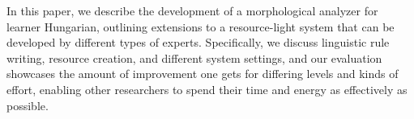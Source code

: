 In this paper, we describe the development of a morphological analyzer for learner Hungarian, outlining extensions to a resource-light system that can be developed by different types of experts. Specifically, we discuss linguistic rule writing, resource creation, and different system settings, and our evaluation showcases the amount of improvement one gets for differing levels and kinds of effort, enabling other researchers to spend their time and energy as effectively as possible.
